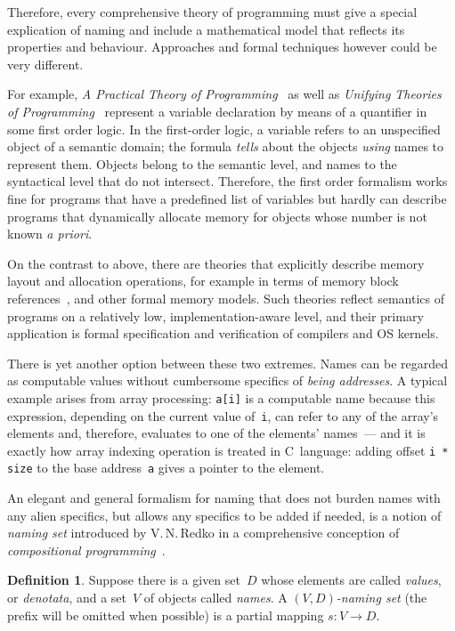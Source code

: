 \documentclass{article}
\theoremstyle{definition}
\newtheorem{Df}{Definition}
\begin{document}
Therefore, every comprehensive theory of programming must give a special
explication of naming and include a mathematical model that reflects its
properties and behaviour.  Approaches and formal techniques however could be
very different.

For example, \emph{A Practical Theory of Programming}~\cite{bib:ptop} as well as
\emph{Unifying Theories of Programming}~\cite{bib:utp} represent a variable
declaration by means of a quantifier in some first order logic.  In the
first-order logic, a variable refers to an unspecified object of a
semantic domain; the formula \emph{tells} about the objects \emph{using} names to
represent them.  Objects belong to the semantic level, and names to the
syntactical level that do not intersect.  Therefore, the first order formalism
works fine for programs that have a predefined list of
variables but hardly can describe programs that dynamically allocate memory for
objects whose number is not known \emph{a priori}.

On the contrast to above, there are theories that explicitly describe memory
layout and allocation operations, for example in terms of memory block
references~\cite{bib:leroy}, and other formal memory models.
Such theories reflect semantics of programs on a
relatively low, implementation-aware level, and their primary application is
formal specification and verification of compilers and OS kernels.

There is yet another option between these two extremes.  Names can be regarded
as computable values without cumbersome specifics of \emph{being addresses}.  A
typical example arises from array processing: \lstinline{a[i]} is a computable
name because this expression, depending on the current value of~\lstinline{i},
can refer to any of the array's elements and, therefore, evaluates to one of
the elements' names~--- and it is exactly how array indexing operation is
treated in C~language: adding offset \lstinline{i * size} to the base
address~\lstinline{a} gives a pointer to the element.

An elegant and general formalism for naming that does not burden names
with any alien specifics, but allows any specifics to be added if needed,
is a notion of \emph{naming set} introduced by V.\,N.\,Redko in a
comprehensive conception of \emph{compositional programming}~\cite{bib:redko}.

\begin{Df}\label{df:naming-set}
Suppose there is a given set~$D$ whose elements are called \emph{values}, or
\emph{denotata}, and a set~$V$ of objects called \emph{names}.
A \emph{$(V,D)$-naming set} (the prefix will be omitted when possible) is a
partial mapping $s: V\to D$.
\end{Df}
\end{document}
